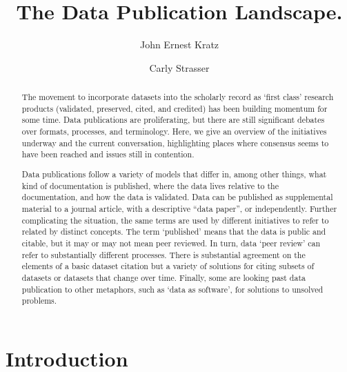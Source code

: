 \documentclass[10pt,a4paper,twocolumn]{article}
\begin{document}
\title{The Data Publication Landscape.}
\author[1]{John Ernest Kratz}
\author[1]{Carly Strasser}

\maketitle
\thispagestyle{fancy}


\begin{abstract}


The movement to incorporate datasets into the scholarly record as `first class' research products (validated, preserved, cited, and credited) has been building momentum for some time.
Data publications are proliferating, but there are still significant debates over formats, processes, and terminology.
Here, we give an overview of the initiatives underway and the current conversation, highlighting places where consensus seems to have been reached and issues still in contention.

Data publications follow a variety of models that differ in, among other things, what kind of documentation is published, where the data lives relative to the documentation, and how the data is validated. Data can be published as supplemental material to a journal article, with a descriptive ``data paper'', or independently.
Further complicating the situation, the same terms are used by different initiatives to refer to related by distinct concepts.
The term `published' means that the data is public and citable, but it may or may not mean peer reviewed.
In turn, data `peer review' can refer to substantially different processes.
There is substantial agreement on the elements of a basic dataset citation but a variety of solutions for citing subsets of datasets or datasets that change over time.
Finally, some are looking past data publication to other metaphors, such as `data as software', for solutions to unsolved problems.

\end{abstract}
\clearpage

\section*{Introduction}\label{introduction}
\end{document}
